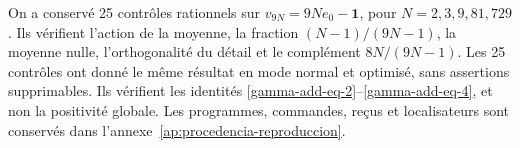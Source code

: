 On a conservé 25 contrôles rationnels sur \(v_{9N}=9Ne_0-\mathbf1\), pour \(N=2,3,9,81,729\). Ils vérifient l'action de la moyenne, la fraction \((N-1)/(9N-1)\), la moyenne nulle, l'orthogonalité du détail et le complément \(8N/(9N-1)\). Les 25 contrôles ont donné le même résultat en mode normal et optimisé, sans assertions supprimables. Ils vérifient les identités \eqref{gamma-add-eq-2}--\eqref{gamma-add-eq-4}, et non la positivité globale. Les programmes, commandes, reçus et localisateurs sont conservés dans l'annexe~\ref{ap:procedencia-reproduccion}.

